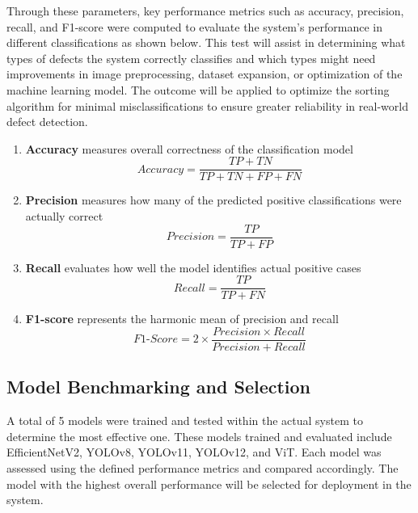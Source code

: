 Through these parameters, key performance metrics such as accuracy, precision, recall, and F1-score were computed to evaluate the system’s performance in different classifications as shown below. This test will assist in determining what types of defects the system correctly classifies and which types might need improvements in image preprocessing, dataset expansion, or optimization of the machine learning model. The outcome will be applied to optimize the sorting algorithm for minimal misclassifications to ensure greater reliability in real-world defect detection.

\begin{enumerate}
	\item \textbf{Accuracy} measures overall correctness of the classification model
	\begin{equation}
	Accuracy = \frac{TP + TN}{TP + TN + FP + FN}
	\end{equation}

	\item \textbf{Precision} measures how many of the predicted positive classifications were actually correct
	\begin{equation}
	Precision = \frac{TP}{TP + FP}
	\end{equation}

	\item \textbf{Recall} evaluates how well the model identifies actual positive cases
	\begin{equation}
	Recall = \frac{TP}{TP + FN}
\end{equation}
	
	\item \textbf{F1-score} represents the harmonic mean of precision and recall
\begin{equation}
	F1\text{-}Score = 2 \times \frac{Precision \times Recall}{Precision + Recall}
	\end{equation}
\end{enumerate}

\subsection{Model Benchmarking and Selection}
A total of 5 models were trained and tested within the actual system to determine the most effective one. These models trained and evaluated include EfficientNetV2, YOLOv8, YOLOv11, YOLOv12, and ViT. Each model was assessed using the defined performance metrics and compared accordingly. The model with the highest overall performance will be selected for deployment in the system.


